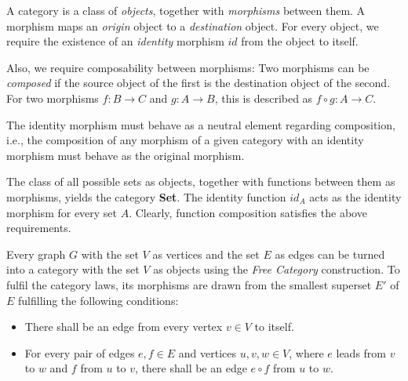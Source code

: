 \begin{definition}
    A category is a class of \textit{objects}, together with \textit{morphisms} between them.
    A morphism maps an \textit{origin} object to a \textit{destination} object.
    For every object, we require the existence of an \textit{identity} morphism $id$ from the object to itself.

    Also, we require composability between morphisms:
    Two morphisms can be \textit{composed} if the source object of the first is
    the destination object of the second.
    For two morphisms $f : B \rightarrow C$ and $g : A \rightarrow B$,
    this is described as $f \circ g : A \rightarrow C$.

    The identity morphism must behave as a neutral element regarding composition, i.e.,
    the composition of any morphism of a given category with an identity morphism
    must behave as the original morphism.
\end{definition}

\begin{example}
    The class of all possible sets as objects, together with functions between them as morphisms,
    yields the category \textbf{Set}.
    The identity function $id_A$ acts as the identity morphism for every set $A$.
    Clearly, function composition satisfies the above requirements.
\end{example}

\begin{example}
    Every graph $G$ with the set $V$ as vertices and the set $E$ as edges
    can be turned into a category with the set $V$ as objects
    using the \textit{Free Category} construction.
    To fulfil the category laws, its morphisms are drawn from
    the smallest superset $E'$ of $E$ fulfilling the following conditions:

    \begin{itemize}
        \item There shall be an edge from every vertex $v \in V$ to itself.
        \item For every pair of edges $e, f \in E$ and vertices $u, v, w \in V$,
              where $e$ leads from $v$ to $w$ and $f$ from $u$ to $v$,
              there shall be an edge $e \circ f$ from $u$ to $w$.
    \end{itemize}
\end{example}


